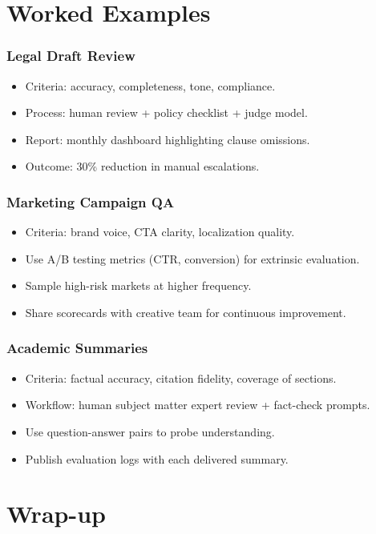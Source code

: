 \documentclass{beamer}
\begin{document}
\section{Worked Examples}

\begin{frame}
    \frametitle{Legal Draft Review}
    \begin{itemize}
        \item Criteria: accuracy, completeness, tone, compliance.
        \item Process: human review + policy checklist + judge model.
        \item Report: monthly dashboard highlighting clause omissions.
        \item Outcome: 30\% reduction in manual escalations.
    \end{itemize}
\end{frame}

\begin{frame}
    \frametitle{Marketing Campaign QA}
    \begin{itemize}
        \item Criteria: brand voice, CTA clarity, localization quality.
        \item Use A/B testing metrics (CTR, conversion) for extrinsic evaluation.
        \item Sample high-risk markets at higher frequency.
        \item Share scorecards with creative team for continuous improvement.
    \end{itemize}
\end{frame}

\begin{frame}
    \frametitle{Academic Summaries}
    \begin{itemize}
        \item Criteria: factual accuracy, citation fidelity, coverage of sections.
        \item Workflow: human subject matter expert review + fact-check prompts.
        \item Use question-answer pairs to probe understanding.
        \item Publish evaluation logs with each delivered summary.
    \end{itemize}
\end{frame}

\section{Wrap-up}
\end{document}
